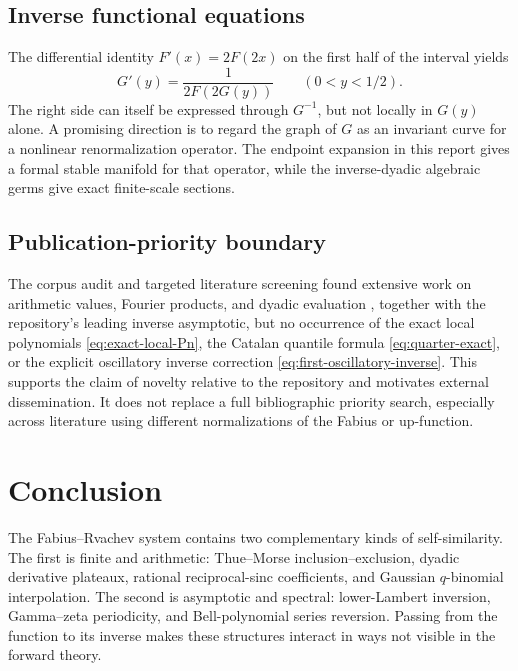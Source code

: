 \documentclass[11pt,oneside]{article}
\numberwithin{equation}{section}
\theoremstyle{definition}
\theoremstyle{remark}
\begin{document}
\subsection{Inverse functional equations}

The differential identity $F'(x)=2F(2x)$ on the first half of the interval yields
\begin{equation}
 G'(y)=\frac1{2F(2G(y))}
 \qquad (0<y<1/2).
 \label{eq:inverse-functional-derivative}
\end{equation}
The right side can itself be expressed through $G^{-1}$, but not locally in $G(y)$ alone.
A promising direction is to regard the graph of $G$ as an invariant curve for a nonlinear
renormalization operator.  The endpoint expansion in this report gives a formal stable
manifold for that operator, while the inverse-dyadic algebraic germs give exact finite-scale
sections.

\subsection{Publication-priority boundary}

The corpus audit and targeted literature screening found extensive work on arithmetic values,
Fourier products, and dyadic evaluation \cite{AriasArithmetic,Haugland2016}, together with the repository's leading inverse asymptotic, but no occurrence of
the exact local polynomials \eqref{eq:exact-local-Pn}, the Catalan quantile formula
\eqref{eq:quarter-exact}, or the explicit oscillatory inverse correction
\eqref{eq:first-oscillatory-inverse}.  This supports the claim of novelty relative to the
repository and motivates external dissemination.  It does not replace a full bibliographic
priority search, especially across literature using different normalizations of the Fabius or
up-function.

\section{Conclusion}
\label{sec:conclusion}

The Fabius--Rvachev system contains two complementary kinds of self-similarity.  The first is
finite and arithmetic: Thue--Morse inclusion--exclusion, dyadic derivative plateaux, rational
reciprocal-sinc coefficients, and Gaussian $q$-binomial interpolation.  The second is
asymptotic and spectral: lower-Lambert inversion, Gamma--zeta periodicity, and Bell-polynomial
series reversion.  Passing from the function to its inverse makes these structures interact in
ways not visible in the forward theory.
\end{document}
